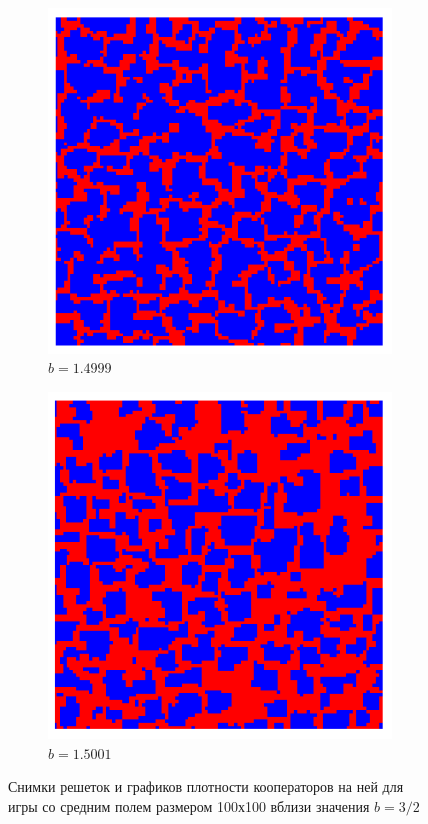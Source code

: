 \documentclass[12pt,a4paper]{article}
\begin{document}
\begin{figure}[H]
		\begin{subfigure}{.5\textwidth}
			\includegraphics[width=1\linewidth]{g1.4999.png}
			\caption{$b=1.4999$}
			\label{newg_left}			
		\end{subfigure}%
		\begin{subfigure}{.5\textwidth}
			\includegraphics[width=1\linewidth]{g1.5001.png}
			\caption{$b=1.5001$}
			\label{newg_right}						
		\end{subfigure}%
		\caption{Снимки решеток и графиков плотности кооператоров на ней для игры со средним полем размером 100х100 вблизи значения $b=3/2$}
		\label{new_exmpl}
	\end{figure}
\end{document}
